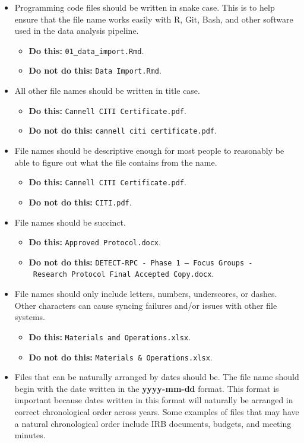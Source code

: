 \documentclass[
  letterpaper,
  DIV=11,
  numbers=noendperiod]{scrreprt}
\providecommand{\tightlist}{%
  \setlength{\itemsep}{0pt}\setlength{\parskip}{0pt}}\usepackage{longtable,booktabs,array}
\begin{document}
\begin{itemize}
\tightlist
\item
  Programming code files should be written in snake case. This is to
  help ensure that the file name works easily with R, Git, Bash, and
  other software used in the data analysis pipeline.

  \begin{itemize}
  \tightlist
  \item
    \textbf{Do this:} \texttt{01\_data\_import.Rmd}.
  \item
    \textbf{Do not do this:} \texttt{Data\ Import.Rmd}.
  \end{itemize}
\item
  All other file names should be written in title case.

  \begin{itemize}
  \tightlist
  \item
    \textbf{Do this:} \texttt{Cannell\ CITI\ Certificate.pdf}.
  \item
    \textbf{Do not do this:} \texttt{cannell\ citi\ certificate.pdf}.
  \end{itemize}
\item
  File names should be descriptive enough for most people to reasonably
  be able to figure out what the file contains from the name.

  \begin{itemize}
  \tightlist
  \item
    \textbf{Do this:} \texttt{Cannell\ CITI\ Certificate.pdf}.
  \item
    \textbf{Do not do this:} \texttt{CITI.pdf}.
  \end{itemize}
\item
  File names should be succinct.

  \begin{itemize}
  \tightlist
  \item
    \textbf{Do this:} \texttt{Approved\ Protocol.docx}.
  \item
    \textbf{Do not do this:}
    \texttt{DETECT-RPC\ -\ Phase\ 1\ –\ Focus\ Groups\ -\ Research\ Protocol\ Final\ Accepted\ Copy.docx}.
  \end{itemize}
\item
  File names should only include letters, numbers, underscores, or
  dashes. Other characters can cause syncing failures and/or issues with
  other file systems.

  \begin{itemize}
  \tightlist
  \item
    \textbf{Do this:} \texttt{Materials\ and\ Operations.xlsx}.
  \item
    \textbf{Do not do this:} \texttt{Materials\ \&\ Operations.xlsx}.
  \end{itemize}
\item
  Files that can be naturally arranged by dates should be. The file name
  should begin with the date written in the \textbf{yyyy-mm-dd} format.
  This format is important because dates written in this format will
  naturally be arranged in correct chronological order across years.
  Some examples of files that may have a natural chronological order
  include IRB documents, budgets, and meeting minutes.


\end{itemize}
\end{document}
